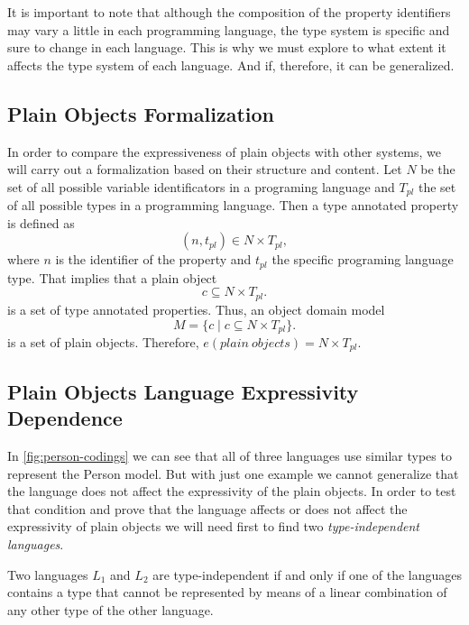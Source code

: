 It is important to note that although the composition of the property identifiers may
vary a little in each programming language, the type system is specific and sure to
change in each language. This is why we must explore to what extent it affects the
type system of each language. And if, therefore, it can be generalized.

\subsection{Plain Objects Formalization}
In order to compare the expressiveness of plain objects with other systems, we will carry out a
formalization based on their structure and content. Let $N$ be the set of all possible variable
identificators in a programing language and $T_{pl}$ the set of all possible types in a programming
language. Then a type annotated property is defined as
\begin{equation}\label{eq:plain-object}
(n,t_{pl}) \in N \times T_{pl},
\end{equation}
where $n$ is the identifier of the property and $t_{pl}$ the specific programing language type. That implies that a plain object
\begin{equation}
c \subseteq N \times T_{pl}.
\end{equation}
is a set of type annotated properties. Thus, an object domain model
\begin{equation}\label{eq:exp-m}
M = \{ c \mid c \subseteq N \times T_{pl} \}.
\end{equation}
is a set of plain objects. Therefore, $e(plain\ objects) = N \times T_{pl} $.

\subsection{Plain Objects Language Expressivity Dependence}
In \cref{fig:person-codings} we can see that all of three languages use similar types to represent the Person model. But with
just one example we cannot generalize that the language does not affect the expressivity of the plain objects. In order to
test that condition and prove that the language affects or does not affect the expressivity of plain objects we will need first
to find two \textit{type-independent languages}.

\begin{definition}
    Two languages $L_1$ and $L_2$ are type-independent if and only if one of the languages contains a type that cannot be
    represented by means of a linear combination of any other type of the other language.
\end{definition}

